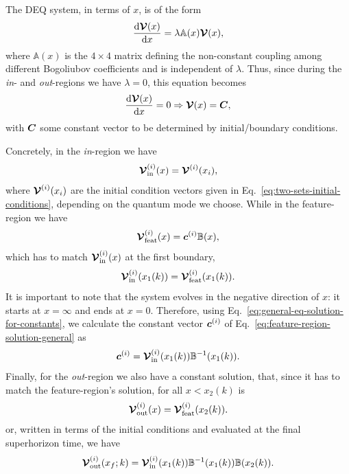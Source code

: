 \documentclass[
 aip,
 jmp,
 amsmath,amssymb,
 reprint,
 nofootinbib,
]{revtex4-2}
\def\mV{{\vb*{\mathcal{V}}}}
\begin{document}
The DEQ system, in terms of $x$, is of the form
\begin{equation}
    \dv{\mV(x)}{x} = \lambda \mathbb{A}(x) \mV(x),
\end{equation}
where $\mathbb{A}(x)$ is the $4 \times 4$ matrix defining the non-constant coupling among different Bogoliubov coefficients and is independent of $\lambda$. Thus, since during the \textit{in}- and \textit{out}-regions we have $\lambda = 0$, this equation becomes
\begin{equation}
    \dv{\mV(x)}{x} = 0 \Rightarrow \mV(x) = \vb*{C},
\end{equation}
with $\vb*{C}$ some constant vector to be determined by initial/boundary conditions.

Concretely, in the \textit{in}-region we have
\begin{equation}
    \mV_{\text{in}}^{(i)}(x) = \mV^{(i)}(x_i),
\end{equation}
where $\mV^{(i)}(x_i)$ are the initial condition vectors given in Eq.~\eqref{eq:two-sets-initial-conditions}, depending on the quantum mode we choose. While in the feature-region we have
\begin{equation}
    \mV_{\text{feat}}^{(i)}(x) = \vb*{c}^{(i)} \mathbb{B}(x),%
    \label{eq:feature-region-solution-general}
\end{equation}
which has to match $\mV_{\text{in}}^{(i)}(x)$ at the first boundary,
\begin{equation}
    \mV_{\text{in}}^{(i)}(x_1(k)) = \mV_{\text{feat}}^{(i)}(x_1(k)).
\end{equation}
It is important to note that the system evolves in the negative direction of $x$: it starts at $x = \infty$ and ends at $x = 0$. Therefore, using Eq.~\eqref{eq:general-eq-solution-for-constants}, we calculate the constant vector $\vb*{c}^{(i)}$ of Eq.~\eqref{eq:feature-region-solution-general} as
\begin{equation}
    \vb*{c}^{(i)} = \mV_{\text{in}}^{(i)}(x_1(k)) \mathbb{B}^{-1}(x_1(k)).
\end{equation}
Finally, for the \textit{out}-region we also have a constant solution, that, since it has to match the feature-region's solution, for all $x < x_2(k)$ is
\begin{equation}
    \mV_{\text{out}}^{(i)}(x) = \mV_{\text{feat}}^{(i)}(x_2(k)).
\end{equation}
or, written in terms of the initial conditions and evaluated at the final superhorizon time, we have
\begin{equation}
    \mV_{\text{out}}^{(i)}(x_f;k)
    =
    \mV_{\text{in}}^{(i)}(x_1(k))
    \mathbb{B}^{-1}(x_1(k))
    \mathbb{B}(x_2(k)).
\end{equation}
\end{document}
